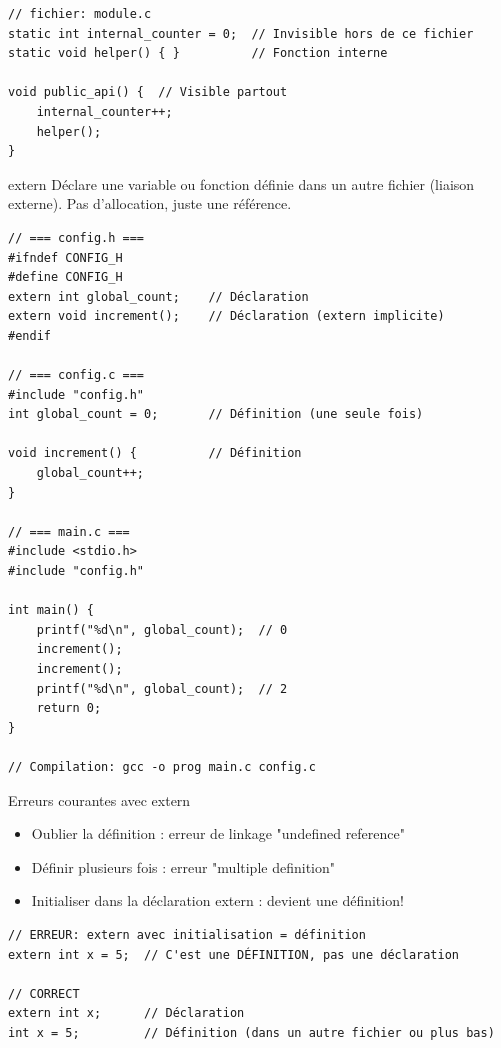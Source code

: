\documentclass[10pt,a4paper]{article}
\begin{document}
\begin{lstlisting}[caption={static global : encapsulation au fichier}]
// fichier: module.c
static int internal_counter = 0;  // Invisible hors de ce fichier
static void helper() { }          // Fonction interne

void public_api() {  // Visible partout
    internal_counter++;
    helper();
}
\end{lstlisting}

\begin{definitionbox}{extern}
Déclare une variable ou fonction définie dans un autre fichier (liaison externe). Pas d'allocation, juste une référence.
\end{definitionbox}

\begin{lstlisting}[caption={extern : exemple multi-fichiers}]
// === config.h ===
#ifndef CONFIG_H
#define CONFIG_H
extern int global_count;    // Déclaration
extern void increment();    // Déclaration (extern implicite)
#endif

// === config.c ===
#include "config.h"
int global_count = 0;       // Définition (une seule fois)

void increment() {          // Définition
    global_count++;
}

// === main.c ===
#include <stdio.h>
#include "config.h"

int main() {
    printf("%d\n", global_count);  // 0
    increment();
    increment();
    printf("%d\n", global_count);  // 2
    return 0;
}

// Compilation: gcc -o prog main.c config.c
\end{lstlisting}

\begin{warningbox}{Erreurs courantes avec extern}
\begin{itemize}
\item Oublier la définition : erreur de linkage "undefined reference"
\item Définir plusieurs fois : erreur "multiple definition"
\item Initialiser dans la déclaration extern : devient une définition!
\end{itemize}
\end{warningbox}

\begin{lstlisting}[caption={Erreurs avec extern}]
// ERREUR: extern avec initialisation = définition
extern int x = 5;  // C'est une DÉFINITION, pas une déclaration

// CORRECT
extern int x;      // Déclaration
int x = 5;         // Définition (dans un autre fichier ou plus bas)
\end{lstlisting}
\end{document}
